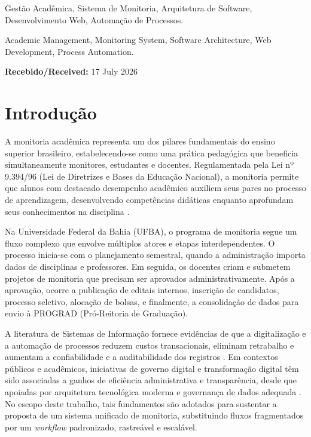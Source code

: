 \documentclass[portuguese]{sbc2025}%
\begin{document}
\begin{frontmatter}
\begin{pchaves}
Gestão Acadêmica, Sistema de Monitoria, Arquitetura de Software, Desenvolvimento Web, Automação de Processos.
\end{pchaves}

\begin{keywords}
Academic Management, Monitoring System, Software Architecture, Web Development, Process Automation.
\end{keywords}

\begin{dates}
\textbf{Recebido/Received:} 17 July 2026
\end{dates}

\end{frontmatter}

\section{Introdução}
\label{sec:intro}

A monitoria acadêmica representa um dos pilares fundamentais do ensino superior brasileiro, estabelecendo-se como uma prática pedagógica que beneficia simultaneamente monitores, estudantes e docentes. Regulamentada pela Lei nº 9.394/96 (Lei de Diretrizes e Bases da Educação Nacional), a monitoria permite que alunos com destacado desempenho acadêmico auxiliem seus pares no processo de aprendizagem, desenvolvendo competências didáticas enquanto aprofundam seus conhecimentos na disciplina \cite{Brasil1996}.

Na Universidade Federal da Bahia (UFBA), o programa de monitoria segue um fluxo complexo que envolve múltiplos atores e etapas interdependentes. O processo inicia-se com o planejamento semestral, quando a administração importa dados de disciplinas e professores. Em seguida, os docentes criam e submetem projetos de monitoria que precisam ser aprovados administrativamente. Após a aprovação, ocorre a publicação de editais internos, inscrição de candidatos, processo seletivo, alocação de bolsas, e finalmente, a consolidação de dados para envio à PROGRAD (Pró-Reitoria de Graduação).

A literatura de Sistemas de Informação fornece evidências de que a digitalização e a automação de processos reduzem custos transacionais, eliminam retrabalho e aumentam a confiabilidade e a auditabilidade dos registros \cite{Laudon_Laudon_2011, Davenport1993, Hammer1993}. Em contextos públicos e acadêmicos, iniciativas de governo digital e transformação digital têm sido associadas a ganhos de eficiência administrativa e transparência, desde que apoiadas por arquitetura tecnológica moderna e governança de dados adequada \cite{WorldBank2022, UNESCO2023}. No escopo deste trabalho, tais fundamentos são adotados para sustentar a proposta de um sistema unificado de monitoria, substituindo fluxos fragmentados por um \textit{workflow} padronizado, rastreável e escalável.
\end{document}
